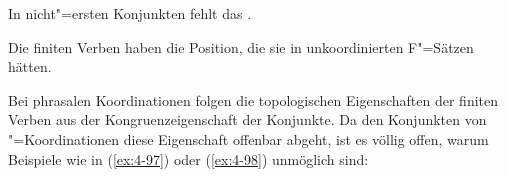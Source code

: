 \documentclass[output=paper]{langsci/langscibook}
\begin{document}
\begin{exe}
\ex
\label{ex:4-96}
\begin{xlist}
\ex%
\label{ex:4-96a}
In nicht"=ersten Konjunkten fehlt das .

\ex%
\label{ex:4-96b}
Die finiten Verben haben die Position, die sie in unkoordinierten F"=Sätzen hätten.
\end{xlist}
\end{exe}
Bei phrasalen Koordinationen folgen die topologischen Eigenschaften der finiten Verben aus der Kongruenzeigenschaft der Konjunkte. Da den Konjunkten von "=Koordinationen diese Eigenschaft offenbar abgeht, ist es völlig offen, warum Beispiele wie in (\ref{ex:4-97}) oder (\ref{ex:4-98}) unmöglich sind:

\begin{exe}
\ex
\label{ex:4-97}
\begin{xlist}


\end{xlist}
\ex
\label{ex:4-98}
\begin{xlist}


\end{xlist}
\end{exe}

\sloppy  
\printbibliography[heading=subbibliography,notkeyword=this]
\label{chap-subjektluecken-end}
\end{document}
